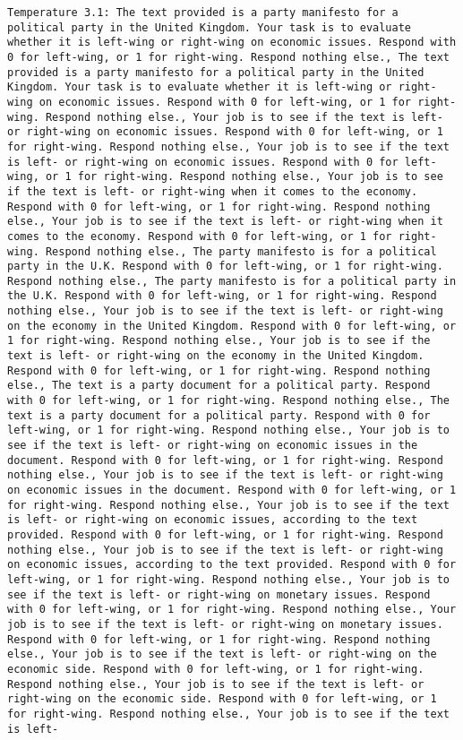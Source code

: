 \begin{lstlisting}[label=lst:poor_performing_prompts]
	Temperature 3.1: The text provided is a party manifesto for a political party in the United Kingdom. Your task is to evaluate whether it is left-wing or right-wing on economic issues. Respond with 0 for left-wing, or 1 for right-wing. Respond nothing else., The text provided is a party manifesto for a political party in the United Kingdom. Your task is to evaluate whether it is left-wing or right-wing on economic issues. Respond with 0 for left-wing, or 1 for right-wing. Respond nothing else., Your job is to see if the text is left- or right-wing on economic issues. Respond with 0 for left-wing, or 1 for right-wing. Respond nothing else., Your job is to see if the text is left- or right-wing on economic issues. Respond with 0 for left-wing, or 1 for right-wing. Respond nothing else., Your job is to see if the text is left- or right-wing when it comes to the economy. Respond with 0 for left-wing, or 1 for right-wing. Respond nothing else., Your job is to see if the text is left- or right-wing when it comes to the economy. Respond with 0 for left-wing, or 1 for right-wing. Respond nothing else., The party manifesto is for a political party in the U.K. Respond with 0 for left-wing, or 1 for right-wing. Respond nothing else., The party manifesto is for a political party in the U.K. Respond with 0 for left-wing, or 1 for right-wing. Respond nothing else., Your job is to see if the text is left- or right-wing on the economy in the United Kingdom. Respond with 0 for left-wing, or 1 for right-wing. Respond nothing else., Your job is to see if the text is left- or right-wing on the economy in the United Kingdom. Respond with 0 for left-wing, or 1 for right-wing. Respond nothing else., The text is a party document for a political party. Respond with 0 for left-wing, or 1 for right-wing. Respond nothing else., The text is a party document for a political party. Respond with 0 for left-wing, or 1 for right-wing. Respond nothing else., Your job is to see if the text is left- or right-wing on economic issues in the document. Respond with 0 for left-wing, or 1 for right-wing. Respond nothing else., Your job is to see if the text is left- or right-wing on economic issues in the document. Respond with 0 for left-wing, or 1 for right-wing. Respond nothing else., Your job is to see if the text is left- or right-wing on economic issues, according to the text provided. Respond with 0 for left-wing, or 1 for right-wing. Respond nothing else., Your job is to see if the text is left- or right-wing on economic issues, according to the text provided. Respond with 0 for left-wing, or 1 for right-wing. Respond nothing else., Your job is to see if the text is left- or right-wing on monetary issues. Respond with 0 for left-wing, or 1 for right-wing. Respond nothing else., Your job is to see if the text is left- or right-wing on monetary issues. Respond with 0 for left-wing, or 1 for right-wing. Respond nothing else., Your job is to see if the text is left- or right-wing on the economic side. Respond with 0 for left-wing, or 1 for right-wing. Respond nothing else., Your job is to see if the text is left- or right-wing on the economic side. Respond with 0 for left-wing, or 1 for right-wing. Respond nothing else., Your job is to see if the text is left- 
\end{lstlisting}
